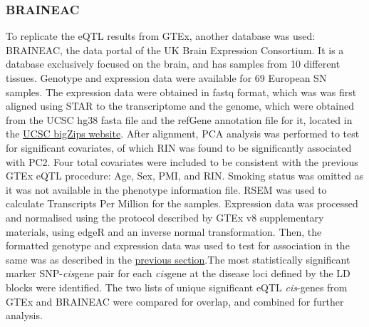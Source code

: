 \documentclass{article}
\begin{document}
\subsubsection{BRAINEAC}
To replicate the eQTL results from GTEx, another database was used: BRAINEAC\cite{Ramasamy2014GeneticBrain}, the data portal of the UK Brain Expression Consortium. It is a database exclusively focused on the brain, and has samples from 10 different tissues. Genotype and expression data were available for 69  European SN samples. The expression data were obtained in fastq format, which was was first aligned using STAR\cite{Dobin2013STAR:Aligner} to the transcriptome and the genome, which were obtained from the UCSC hg38 fasta file and the refGene annotation file for it, located in the \href{https://hgdownload.soe.ucsc.edu/goldenPath/hg38/bigZips/}{UCSC bigZips website}. After alignment, PCA analysis was performed to test for significant covariates, of which RIN was found to be significantly associated with PC2. Four total covariates were included to be consistent with the previous GTEx eQTL procedure: Age, Sex, PMI, and RIN. Smoking status was omitted as it was not available in the phenotype information file.
RSEM\cite{Li2011RSEM:Genome} was used to calculate Transcripts Per Million for the samples. Expression data was processed and normalised using the protocol described by GTEx v8 supplementary materials\cite{Aguet2020TheTissues}, using edgeR\cite{Robinson2010ttedgeR/ttData} and an inverse normal transformation. Then, the formatted genotype and expression data was used to test for association in the same was as described in the \hyperref[subsec:GTEx]{previous section}.The most statistically significant marker SNP-\textit{cis}gene pair for each \textit{cis}gene at the disease loci defined by the LD blocks were identified. The two lists of unique significant eQTL \textit{cis}-genes from GTEx and BRAINEAC were compared for overlap, and combined for further analysis. 
\end{document}
